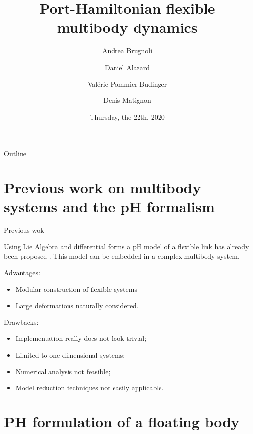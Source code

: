 \documentclass[aspectratio=169]{ISAE-Beamer}
\title[Virtual INFIDHEM meeting]{Port-Hamiltonian flexible multibody dynamics}
\institute[ISAE]
{\inst{1}ISAE-SUPAERO, Toulouse}
\author[Andrea Brugnoli]{Andrea Brugnoli\inst{1} \and Daniel Alazard\inst{1} \and Valérie Pommier-Budinger\inst{1} \and Denis Matignon\inst{1}}
\date[Toulouse, 22/10/20]{Thursday, the 22th, 2020}
\begin{document}
\maketitle

\begin{frame}{Outline}

\tableofcontents

\end{frame}

\section{Previous work on multibody systems and the pH formalism}

\begin{frame}{Previous wok}

Using Lie Algebra and differential forms a pH model of a flexible link has already been proposed . This model can be embedded in a complex multibody system. \\
\begin{overlayarea}{\textwidth}{0.55\textheight}
	\setlength{\abovedisplayskip}{1pt}
	\setlength{\belowdisplayskip}{1pt}
Advantages:
\begin{itemize}
	\item {Modular construction of flexible systems;}
	\item {Large deformations naturally considered.}
\end{itemize}
Drawbacks:
\begin{itemize}
	\item {Implementation really does not look trivial;}
	\item {Limited to one-dimensional systems;}
	\item {Numerical analysis not feasible;}
	\item {Model reduction techniques not easily applicable.} 
\end{itemize}
\end{overlayarea}
\end{frame}

\section{PH formulation of a floating body}
\end{document}
